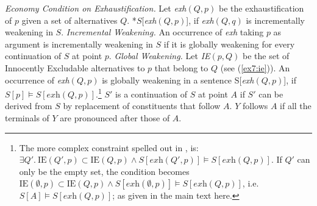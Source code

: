 \begin{exe}
	\ex\label{ex7:economy} {\textit{Economy Condition on Exhaustification. } Let \textit{exh}$(Q, p)$ be the exhaustification of $p$ given a set of alternatives $Q$. *$S$[\textit{exh}$(Q, p)$], if \textit{exh}$(Q, q)$ is incrementally weakening in $S$.}
	\ex\label{ex7:economy-incr-wk} {\textit{Incremental Weakening. }An occurrence of \textit{exh} taking $p$ as argument is incrementally weakening in $S$ if it is globally weakening for every continuation of $S$ at point $p$.}
	\ex\label{ex7:economy-gl-wk} {\textit{Global Weakening. }Let \textit{IE}$(p, Q)$ be the set of Innocently Excludable alternatives to $p$ that belong to $Q$ (see (\ref{ex7:ie})). An occurrence of \textit{exh}$(Q, p)$ is globally weakening in a sentence S[\textit{exh}$(Q, p)$], if $S[p] \vDash S[\textit{exh}(Q, p)]$.\footnote{The more complex constraint spelled out in \citet{Fox2018}, is: $\exists Q'. \ \text{IE}(Q', p) \subset \text{IE}(Q, p) \wedge S[\textit{exh}(Q', p)] \vDash S[\textit{exh}(Q, p)]$. If $Q'$ can only be the empty set, the condition becomes $\text{IE}(\emptyset, p) \subset \text{IE}(Q, p) \wedge S[\textit{exh}(\emptyset, p)] \vDash S[\textit{exh}(Q, p)]$, i.e. $S[A] \vDash S[\textit{exh}(Q, p)]$; as given in the main text here.}}
	\ex\label{ex7:economy-cont} {$S'$ is a continuation of $S$ at point $A$ if $S'$ can be derived from $S$ by replacement of constituents that follow $A$.}
	\ex\label{ex7:economy-prec} {$Y$ follows $A$ if all the terminals of $Y$ are pronounced after those of $A$.}
\end{exe}
%
%

